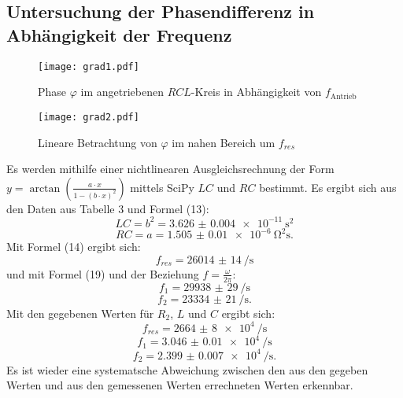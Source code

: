 \subsection{Untersuchung der Phasendifferenz in Abhängigkeit der Frequenz}
\begin{figure}[H]
	\centering
	\caption{Phase $\varphi$ im angetriebenen $RCL$-Kreis in Abhängigkeit von $f_{\text{Antrieb}}$ }
	\texttt{[image: grad1.pdf]}
	\label{fig:grad1}
\end{figure}
\begin{figure}[H]
	\centering
	\caption{Lineare Betrachtung von $\varphi$ im nahen Bereich um $f_{res}$}
	\texttt{[image: grad2.pdf]}
	\label{fig:grad2}
\end{figure}

\newpage
Es werden mithilfe einer nichtlinearen Ausgleichsrechnung der Form $y=\arctan \left(\frac{a\cdot x}{1-(b\cdot x)^2}\right)$ mittels SciPy \cite{scipy} $LC$ und $RC$ bestimmt. Es ergibt sich aus den Daten aus Tabelle 3 und Formel (13):
\begin{displaymath}
LC = b^2 = \SI{3.626(4)e-11}{\second\squared}
\end{displaymath}
\begin{displaymath}
RC = a = \SI{1.505(10)e-6}{\ohm\squared\second}\text{.}
\end{displaymath}
Mit Formel (14) ergibt sich:
\begin{displaymath}
f_{res} = \SI{26014(14)}{\per\second}
\end{displaymath}
und mit Formel (19) und der Beziehung $f = \frac{\omega}{2\pi}$:
\begin{displaymath}
f_1 = \SI{29938(29)}{\per\second}
\end{displaymath}
\begin{displaymath}
f_2 = \SI{23334(21)}{\per\second}\text{.}
\end{displaymath}
Mit den gegebenen Werten für $R_2$, $L$ und $C$ ergibt sich:
\begin{displaymath}
f_{res} = \SI{2664(8)e4}{\per\second}
\end{displaymath}
\begin{displaymath}
f_1 = \SI{3.046(10)e4}{\per\second}
\end{displaymath}
\begin{displaymath}
f_2 = \SI{2.399(7)e4}{\per\second}\text{.}
\end{displaymath}
Es ist wieder eine systematsche Abweichung zwischen den aus den gegeben Werten und aus den gemessenen Werten errechneten Werten erkennbar.


